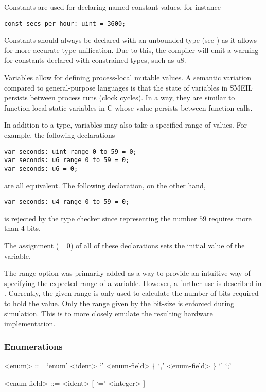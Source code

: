 \noindent Constants are used for declaring named constant values, for instance
\begin{lstlisting}[language=smeil]
const secs_per_hour: uint = 3600;
\end{lstlisting}
Constants should always be declared with an unbounded type (see
) as it allows for more accurate type unification. Due to
this, the compiler will emit a warning for constants declared with constrained
types, such as {\ttfamily u8}.

Variables allow for defining process-local mutable values. A semantic variation
compared to general-purpose languages is that the state of variables in SMEIL
persists between process runs (clock cycles). In a way, they are similar to
function-local {\ttfamily static} variables in C whose value persists between
function calls.

In addition to a type, variables may also take a specified {\ttfamily range} of
values. For example, the following declarations
\begin{lstlisting}[language=smeil]
var seconds: uint range 0 to 59 = 0;
var seconds: u6 range 0 to 59 = 0;
var seconds: u6 = 0;
\end{lstlisting}
are all equivalent. The following declaration, on the other hand,
\begin{lstlisting}[language=smeil]
var seconds: u4 range 0 to 59 = 0;
\end{lstlisting}
is rejected by the type checker since representing the number $59$ requires more
than 4 bits.

The assignment ({\ttfamily = 0}) of all of these declarations sets the initial
value of the variable.

The {\ttfamily range} option was primarily added as a way to provide an
intuitive way of specifying the expected range of a variable. However, a further
use is described in . Currently, the given range is only used
to calculate the number of bits required to hold the value. Only the range given
by the bit-size is enforced during simulation. This is to more closely emulate
the resulting hardware implementation.

\subsubsection{Enumerations}
\begin{grammar}
<enum> ::= `enum' <ident> `{' <enum-field> \{ `,' <enum-field>  \} `}' `;'

<enum-field> ::= <ident> [ `=' <integer> ]
\end{grammar}

